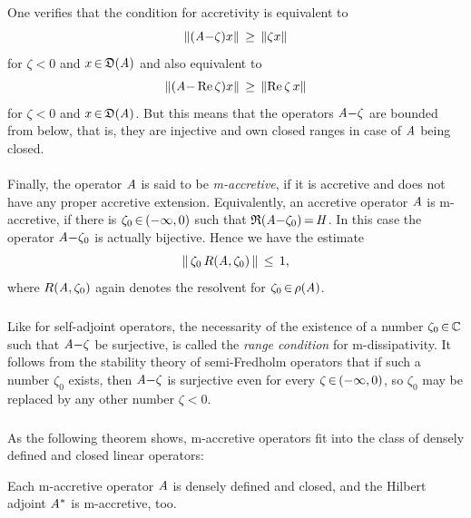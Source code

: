 \documentclass[11pt,twoside]{article}
\begin{document}
\subparagraph{}
One verifies that the condition for accretivity is equivalent to
\begin{equation}\label{ACCRETIVE_PROPERTY}
\left\lVert (\mathit{A} {-} \zeta)x \right\rVert \, \geq \, \left\lVert \zeta x \right\rVert
\end{equation}
for $\zeta < 0$ and $x {\,\in\,} \mathfrak{D}(\mathit{A})$ and also equivalent to
\[
\left\lVert (\mathit{A} {-} \operatorname{Re} \zeta)x \right\rVert \, \geq \, \left\lVert \operatorname{Re} \zeta \, x \right\rVert
\]
for $\zeta < 0$ and $x {\,\in\,} \mathfrak{D}(\mathit{A})$.
But this means that the operators $\mathit{A} {-} \zeta$ are bounded from below,
that is, 
they are injective and own closed ranges in case of $\mathit{A}$ being closed.

\paragraph{} %
Finally,
the operator $\mathit{A}$ is said to be \textit{m-accretive},
if it is accretive and does not have any proper accretive extension.
Equivalently,
an accretive operator $\mathit{A}$ is m-accretive,
if there is $\zeta_0 {\,\in\,} (-\infty,0)$
such that $\mathfrak{R}(\mathit{A} {-} \zeta_0) {\,=\,} \mathit{H}$.
In this case
the operator $\mathit{A} {-} \zeta_0$ is actually bijective.
Hence we have the estimate
\[
\left\lVert \, \zeta_0 \, R(\mathit{A},\zeta_0)\, \right\rVert \, \leq \, 1,
\]  
where $R(\mathit{A},\zeta_0)$ again denotes the resolvent
for $\zeta_0 {\,\in\,} \rho(\mathit{A})$.

\subparagraph{} %
Like for self-adjoint operators,
the necessarity of the existence of a number $\zeta_0 {\,\in\,} {\mathbb{C}}$
such that $\mathit{A} {-} \zeta$ be surjective,
is called the \textit{range condition} for m-dissipativity.
It follows from the stability theory of semi-Fredholm operators
that if such a number $\zeta_0$ exists,
then $\mathit{A} {-} \zeta$ is surjective even for every $\zeta {\,\in\,} (-\infty,0)$,
so $\zeta_0$ may be replaced by any other number $\zeta < 0$.

\subparagraph{} %
As the following theorem shows,
m-accretive operators fit into the class of densely defined and
closed linear operators:

\begin{theorem}\label{M_ACCRETIVITY_IMPLIES_CLOSENESS}
Each m-accretive operator $\mathit{A}$ is densely defined and closed,
and the Hilbert adjoint $\mathit{A}^*$ is m-accretive,
too.
\end{theorem}
\end{document}
